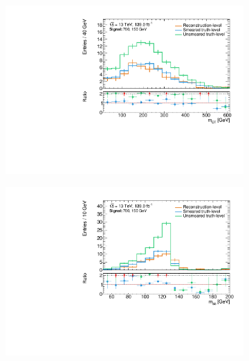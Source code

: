 \begin{figure}
\begin{subfigure}[b]{0.45\linewidth}
	\end{subfigure}\hfill
	\begin{subfigure}[b]{0.45\linewidth}
		\centering\includegraphics[width=\textwidth]{20210324/700_150/mct_C1N2_Wh_hbb_700p0_150p0_smeared.pdf}
	\end{subfigure}\hfill
	\begin{subfigure}[b]{0.45\linewidth}
		\centering\includegraphics[width=\textwidth]{20210324/700_150/mbb_C1N2_Wh_hbb_700p0_150p0_smeared.pdf}
	\end{subfigure}\hfill
	\begin{subfigure}[b]{0.45\linewidth}

\end{subfigure}
\end{figure}
